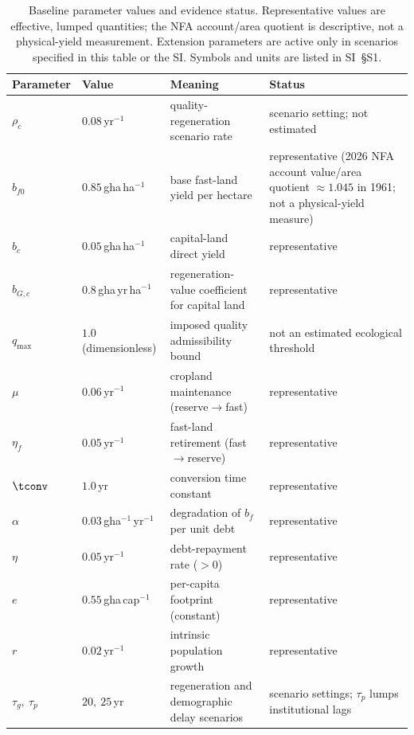 \begin{table}[!htbp]
\centering\footnotesize
\renewcommand{\arraystretch}{0.80}
\caption{Baseline parameter values and evidence status. Representative values are effective, lumped quantities; the NFA account/area quotient is descriptive, not a physical-yield measurement. Extension parameters are active only in scenarios specified in this table or the SI. Symbols and units are listed in SI~\S S1.}
\label{tab:params}
\setlength{\tabcolsep}{4pt}
\begin{tabularx}{\textwidth}{@{}>{\raggedright\arraybackslash}p{} >{\raggedright\arraybackslash}p{} >{\raggedright\arraybackslash}X >{\raggedright\arraybackslash}p{}@{}}
\toprule
Parameter & Value & Meaning & Status \\
\midrule
$\rho_c$ & $0.08$\,yr$^{-1}$ & quality-regeneration scenario rate & scenario setting; not estimated \\
$b_{f0}$ & $0.85$\,gha\,ha$^{-1}$ & base fast-land yield per hectare & representative (2026 NFA account value/area quotient $\approx1.045$ in 1961; not a physical-yield measure) \\
$b_c$ & $0.05$\,gha\,ha$^{-1}$ & capital-land direct yield & representative \\
$b_{G,c}$ & $0.8$\,gha\,yr\,ha$^{-1}$ & regeneration-value coefficient for capital land & representative \\
$q_{\max}$ & $1.0$ (dimensionless) & imposed quality admissibility bound & not an estimated ecological threshold \\
$\mu$ & $0.06$\,yr$^{-1}$ & cropland maintenance (reserve$\to$fast) & representative \\
$\eta_f$ & $0.05$\,yr$^{-1}$ & fast-land retirement (fast$\to$reserve) & representative \\
$\tconv$ & $1.0$\,yr & conversion time constant & representative \\
$\alpha$ & $0.03$\,gha$^{-1}$\,yr$^{-1}$ & degradation of $b_f$ per unit debt & representative \\
$\eta$ & $0.05$\,yr$^{-1}$ & debt-repayment rate ($>0$) & representative \\
$e$ & $0.55$\,gha\,cap$^{-1}$ & per-capita footprint (constant) & representative \\
$r$ & $0.02$\,yr$^{-1}$ & intrinsic population growth & representative \\
$\tau_g,\ \tau_p$ & $20,\ 25$\,yr & regeneration and demographic delay scenarios & scenario settings; $\tau_p$ lumps institutional lags \\

\end{tabularx}
\end{table}
